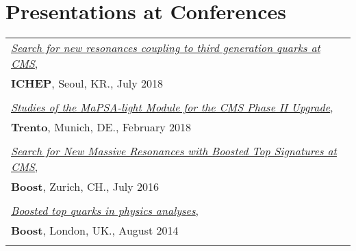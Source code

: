 \documentclass[12pt]{article}
\begin{document}
\section*{Presentations at Conferences}

\begin{tabular}{l}
\href{https://indico.cern.ch/event/686555/contributions/2978188/}{\textit{\underline{Search for new resonances coupling to third generation quarks at CMS}}}, \\
\textbf{ICHEP}, Seoul, KR., July 2018 \\ \\
\href{https://indico.cern.ch/event/666427/contributions/2881500/}{\textit{\underline{Studies of the MaPSA-light Module for the CMS Phase II Upgrade}}}, \\
\textbf{Trento}, Munich, DE., February 2018 \\ \\
\href{https://indico.cern.ch/event/439039/contributions/2223287/}{\textit{\underline{Search for New Massive Resonances with Boosted Top Signatures at CMS}}}, \\
\textbf{Boost}, Zurich, CH., July 2016 \\ \\
\href{https://indico.cern.ch/event/302395/contributions/692364/}{\textit{\underline{Boosted top quarks in physics analyses}}}, \\
\textbf{Boost}, London, UK., August 2014 \\ \\
\end{tabular}
\end{document}
